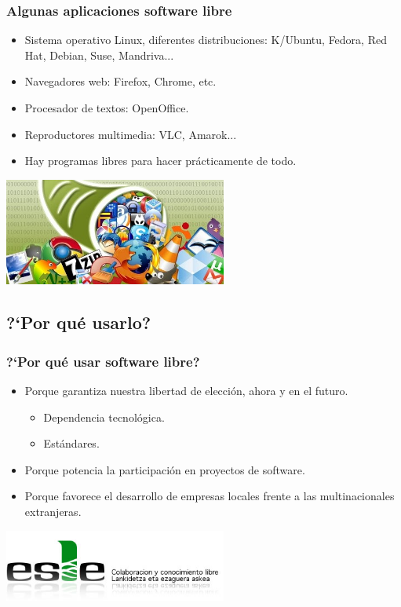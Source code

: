 \documentclass[xcolor=dvipsnames]{beamer}    %
\begin{document}
\begin{frame}
 \frametitle{Algunas aplicaciones software libre}
 \begin{itemize}
  \item Sistema operativo Linux, diferentes distribuciones: K/Ubuntu, Fedora,
Red Hat, Debian, Suse, Mandriva...
    \item Navegadores web: Firefox, Chrome, etc.
    \item Procesador de textos: OpenOffice.
    \item Reproductores multimedia: VLC, Amarok...
    \item Hay programas libres para hacer pr\'acticamente de todo.
 \end{itemize}
 \begin{center}
\includegraphics[width=0.55\textwidth]{./Utils/Aplicaciones-libres.jpg}  
\end{center} 
\end{frame}

\subsection{?`Por qu\'e usarlo?}

\begin{frame}
 \frametitle{?`Por qu\'e usar software libre?}
 \begin{itemize}
  \item Porque garantiza nuestra libertad de elecci\'on, ahora y en el futuro.
  \begin{itemize}
    \item Dependencia tecnol\'ogica.
    \item Est\'andares.
    \end{itemize}
    \item Porque potencia la participaci\'on en proyectos de software.
    \item Porque favorece el desarrollo de empresas locales frente a las
multinacionales extranjeras.
 \end{itemize}
 \begin{center}
\includegraphics[width=0.55\textwidth]{./Utils/logo-esle.jpg}   \end{center}  
\end{frame}
\end{document}
